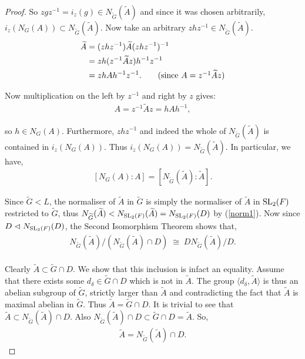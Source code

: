 \begin{proof}
  So $z g z^{-1} = i_z(g) \in N_{\widetilde{G}}({\widetilde{A}})$ and since it was chosen arbitrarily, $i_z(N_G(A)) \subset N_{\widetilde{G}}({\widetilde{A}})$. Now take an arbitrary $z h z^{-1} \in N_{\widetilde{G}}({\widetilde{A}})$.
  \begin{align*} {\widetilde{A}} &= (z h z^{-1}) {\widetilde{A}} (z h z^{-1})^{-1}
  \\ &= z h (z^{-1} {\widetilde{A}} z) h^{-1} z^{-1}
  \\ &= z h A h^{-1} z^{-1}. \tag{since $A = z^{-1} {\widetilde{A}} z$}
  \end{align*}
  
  Now multiplication on the left by $z^{-1}$ and right by $z$ gives:
  \begin{align*} A = z^{-1} {\widetilde{A}} z = h A h^{-1},
  \end{align*}
  
  so $h \in N_G(A)$. Furthermore, $z h z^{-1}$ and indeed the whole of $N_{\widetilde{G}}({\widetilde{A}})$ is contained in $i_z(N_G(A))$. Thus $ i_z(N_G(A)) = N_{\widetilde{G}}({\widetilde{A}})$. In particular, we have,
  \begin{align}\label{6.8iv1} [N_G(A): A] = [N_{\widetilde{G}}({\widetilde{A}}): {\widetilde{A}}].
  \end{align}
  
  Since ${\widetilde{G}} < L$, the normaliser of ${\widetilde{A}}$ in ${\widetilde{G}}$ is simply the normaliser of ${\widetilde{A}}$ in $\operatorname{SL}_2(F)$ restricted to ${\widetilde{G}}$, thus $N_{\widetilde{G}}({\widetilde{A}}) < N_{\operatorname{SL}_2(F)}({\widetilde{A}}) = N_{\operatorname{SL}_2(F)}(D)$ by (\ref{norm1}). Now since $D \vartriangleleft N_{\operatorname{SL}_2(F)}(D)$, the Second Isomorphism Theorem shows that,
  \begin{align}\label{2iso} N_{\widetilde{G}}({\widetilde{A}})/( N_{\widetilde{G}}({\widetilde{A}}) \cap D) \; \cong \; DN_{\widetilde{G}}({\widetilde{A}}) / D.
  \end{align}
  \\
  Clearly ${\widetilde{A}} \subset {\widetilde{G}} \cap D$. We show that this inclusion is infact an equality. Assume that there exists some $d_\delta \in  {\widetilde{G}} \cap D$ which is not in ${\widetilde{A}}$. The group $\langle d_\delta , {\widetilde{A}} \rangle$ is thus an abelian subgroup of ${\widetilde{G}}$, strictly larger than ${\widetilde{A}}$ and contradicting the fact that ${\widetilde{A}}$ is maximal abelian in ${\widetilde{G}}$. Thus ${\widetilde{A}} =  {\widetilde{G}} \cap D$. It is trivial to see that ${\widetilde{A}} \subset N_{\widetilde{G}}({\widetilde{A}}) \cap D$. Also $N_{\widetilde{G}}({\widetilde{A}}) \cap D \subset {\widetilde{G}} \cap D = {\widetilde{A}}$. So,
  \begin{align}\label{parti} {\widetilde{A}} =  N_{\widetilde{G}}({\widetilde{A}}) \cap D.
  \end{align}
  

\end{proof}
